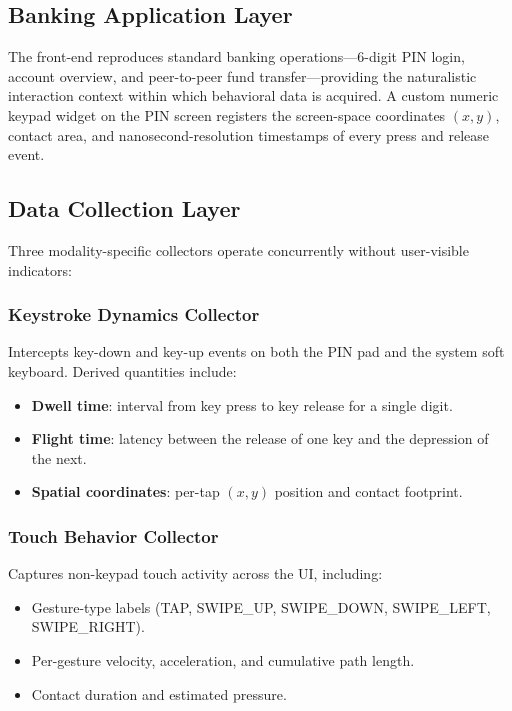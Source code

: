 \documentclass[conference]{IEEEtran}
\begin{document}
\subsection{Banking Application Layer}
The front-end reproduces standard banking operations---6-digit PIN login, account overview, and peer-to-peer fund transfer---providing the naturalistic interaction context within which behavioral data is acquired. A custom numeric keypad widget on the PIN screen registers the screen-space coordinates $(x, y)$, contact area, and nanosecond-resolution timestamps of every press and release event.

\subsection{Data Collection Layer}
Three modality-specific collectors operate concurrently without user-visible indicators:

\subsubsection{Keystroke Dynamics Collector}
Intercepts key-down and key-up events on both the PIN pad and the system soft keyboard. Derived quantities include:
\begin{itemize}
    \item \textbf{Dwell time}: interval from key press to key release for a single digit.
    \item \textbf{Flight time}: latency between the release of one key and the depression of the next.
    \item \textbf{Spatial coordinates}: per-tap $(x, y)$ position and contact footprint.
\end{itemize}

\subsubsection{Touch Behavior Collector}
Captures non-keypad touch activity across the UI, including:
\begin{itemize}
    \item Gesture-type labels (TAP, SWIPE\_UP, SWIPE\_DOWN, SWIPE\_LEFT, SWIPE\_RIGHT).
    \item Per-gesture velocity, acceleration, and cumulative path length.
    \item Contact duration and estimated pressure.
\end{itemize}
\end{document}
